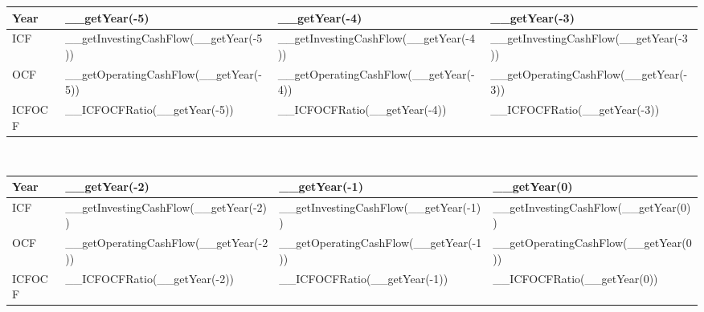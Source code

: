 \begin{tabularx}{\textwidth}{|X|X|X|X|}
 \hline
 Year                        & __getYear(-5)                          & __getYear(-4)                          & __getYear(-3)                         \\
 \hline
 ICF                         & __getInvestingCashFlow(__getYear(-5))  & __getInvestingCashFlow(__getYear(-4))  & __getInvestingCashFlow(__getYear(-3)) \\
 OCF                         & __getOperatingCashFlow(__getYear(-5))  & __getOperatingCashFlow(__getYear(-4))  & __getOperatingCashFlow(__getYear(-3)) \\
 \rowcolor{lightgray} ICFOCF & __ICFOCFRatio(__getYear(-5))           & __ICFOCFRatio(__getYear(-4))           & __ICFOCFRatio(__getYear(-3))          \\
 \hline
\end{tabularx}\\

\begin{tabularx}{\textwidth}{|X|X|X|X|}
 \hline
 Year                        & __getYear(-2)                          & __getYear(-1)                          & __getYear(0)                         \\
 \hline
 ICF                         & __getInvestingCashFlow(__getYear(-2))  & __getInvestingCashFlow(__getYear(-1))  & __getInvestingCashFlow(__getYear(0)) \\
 OCF                         & __getOperatingCashFlow(__getYear(-2))  & __getOperatingCashFlow(__getYear(-1))  & __getOperatingCashFlow(__getYear(0)) \\
 \rowcolor{lightgray} ICFOCF & __ICFOCFRatio(__getYear(-2))           & __ICFOCFRatio(__getYear(-1))           & __ICFOCFRatio(__getYear(0))          \\
 \hline
\end{tabularx}
